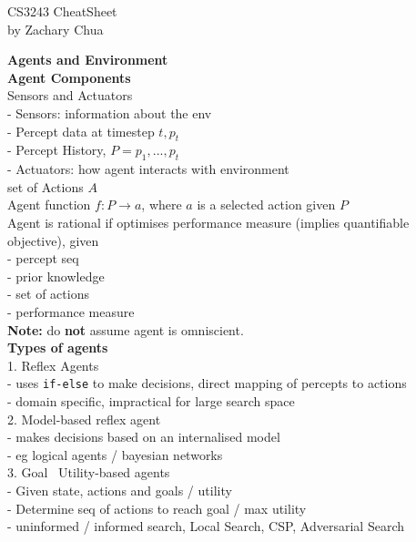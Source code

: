 \documentclass[10pt, a4paper]{article}
\author{Zachary Chua Yan Ern}
\date{February 2022}
\newcommand{\highlight}[1]{{\color{red}\textbf{#1}}}
\newcommand{\blue}[1]{{\color{MidnightBlue}#1}}
\newcommand{\red}[1]{{\color{red}#1}}
\newcommand{\green}[1]{{\color{ForestGreen}#1}}
\newcommand{\header}[1]{{\normalsize\textbf{#1}}}
\newcommand{\tab}[0]{\hspace*{2mm}}
\begin{document}
	\scriptsize %
	\setlength\parindent{0pt}
	\setlength{\columnseprule}{0.1pt}
	
	\begin{center}
		{\large CS3243 CheatSheet}\\
		by Zachary Chua
	\end{center}
	
	\begin{multicols*}{3}
	  \header{Agents and Environment}\\

	  \textbf{Agent Components}\\
	  Sensors and Actuators\\
	  - Sensors: information about the env\\
	  \tab - Percept data at timestep $t, p_{t}$\\
	  \tab - Percept History, $P = {p_{1}, ..., p_{t}}$\\
	  - Actuators: how agent interacts with environment\\
	  \tab set of \blue{Actions} $A$\\
	  \green{Agent function $f: P \rightarrow a$}, where $a$ is a selected action given $P$\\
	  Agent is rational if optimises performance measure (implies quantifiable objective), given\\
	  - percept seq\\
	  - prior knowledge\\
	  - set of actions\\
	  - performance measure\\
	  \highlight{Note:} do \textbf{not} assume agent is omniscient.\\

	  \textbf{Types of agents}\\
	  1. Reflex Agents\\
	  \tab - uses \texttt{if-else} to make decisions, direct mapping of percepts to actions\\
	  \tab - domain specific, impractical for large search space\\
	  2. Model-based reflex agent\\
	  \tab - makes decisions based on an internalised model\\
	  \tab - eg logical agents / bayesian networks\\
	  3. Goal \ Utility-based agents\\
	  \tab - Given \red{state, actions and goals / utility}\\
	  \tab - Determine \green{seq of actions} to reach goal / max utility\\
	  \tab - uninformed / informed search, Local Search, CSP, Adversarial Search\\


\end{multicols*}
\end{document}
